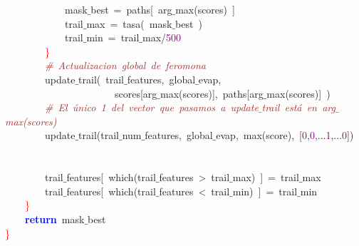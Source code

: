 \mbox{}\ \ \ \ \ \ \ \ \ \ \ \ mask$\_$best\ \textcolor{BrickRed}{=}\ paths\textcolor{BrickRed}{[}\ arg$\_$max\textcolor{BrickRed}{(}scores\textcolor{BrickRed}{)}\ \textcolor{BrickRed}{]} \\
\mbox{}\ \ \ \ \ \ \ \ \ \ \ \ trail$\_$max\ \textcolor{BrickRed}{=}\ tasa\textcolor{BrickRed}{(}\ mask$\_$best\ \textcolor{BrickRed}{)} \\
\mbox{}\ \ \ \ \ \ \ \ \ \ \ \ trail$\_$min\ \textcolor{BrickRed}{=}\ trail$\_$max\textcolor{BrickRed}{/}\textcolor{Purple}{500} \\
\mbox{}\ \ \ \ \ \ \ \ \textcolor{Red}{\}} \\
\mbox{}\ \ \ \ \ \ \ \ \textit{\textcolor{Brown}{\#\ Actualizacion\ global\ de\ feromona}} \\
\mbox{}\ \ \ \ \ \ \ \ update$\_$trail\textcolor{BrickRed}{(}\ trail$\_$features\textcolor{BrickRed}{,}\ global$\_$evap\textcolor{BrickRed}{,} \\
\mbox{}\ \ \ \ \ \ \ \ \ \ \ \ \ \ \ \ \ \ \ \ \ \ scores\textcolor{BrickRed}{[}arg$\_$max\textcolor{BrickRed}{(}scores\textcolor{BrickRed}{)],}\ paths\textcolor{BrickRed}{[}arg$\_$max\textcolor{BrickRed}{(}scores\textcolor{BrickRed}{)]}\ \textcolor{BrickRed}{)} \\
\mbox{}\ \ \ \ \ \ \ \ \textit{\textcolor{Brown}{\#\ El\ único\ 1\ del\ vector\ que\ pasamos\ a\ update$\_$trail\ está\ en\ arg$\_$max(scores)}} \\
\mbox{}\ \ \ \ \ \ \ \ update$\_$trail\textcolor{BrickRed}{(}trail$\_$num$\_$features\textcolor{BrickRed}{,}\ global$\_$evap\textcolor{BrickRed}{,}\ max\textcolor{BrickRed}{(}score\textcolor{BrickRed}{),}\ \textcolor{BrickRed}{[}\textcolor{Purple}{0}\textcolor{BrickRed}{,}\textcolor{Purple}{0}\textcolor{BrickRed}{,...}\textcolor{Purple}{1}\textcolor{BrickRed}{,...}\textcolor{Purple}{0}\textcolor{BrickRed}{])} \\
\mbox{} \\
\mbox{} \\
\mbox{}\ \ \ \ \ \ \ \ trail$\_$features\textcolor{BrickRed}{[}\ which\textcolor{BrickRed}{(}trail$\_$features\ \textcolor{BrickRed}{\textgreater{}}\ trail$\_$max\textcolor{BrickRed}{)}\ \textcolor{BrickRed}{]}\ \textcolor{BrickRed}{=}\ trail$\_$max \\
\mbox{}\ \ \ \ \ \ \ \ trail$\_$features\textcolor{BrickRed}{[}\ which\textcolor{BrickRed}{(}trail$\_$features\ \textcolor{BrickRed}{\textless{}}\ trail$\_$min\textcolor{BrickRed}{)}\ \textcolor{BrickRed}{]}\ \textcolor{BrickRed}{=}\ trail$\_$min \\
\mbox{}\ \ \ \ \textcolor{Red}{\}} \\
\mbox{}\ \ \ \ \textbf{\textcolor{Blue}{return}}\ mask$\_$best \\
\mbox{}\textcolor{Red}{\}} \\
\mbox{}

